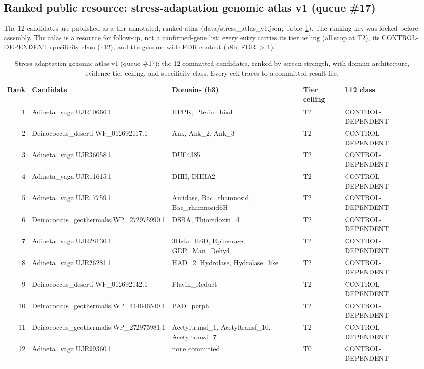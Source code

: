 \documentclass[12pt,a4paper]{article}
\begin{document}
\subsection{Ranked public resource: stress-adaptation genomic atlas v1 (queue \#17)}
The 12 candidates are published as a tier-annotated, ranked atlas (data/stress\_atlas\_v1.json; Table~\ref{tab:atlas}). The ranking key was locked before assembly. The atlas is a resource for follow-up, not a confirmed-gene list: every entry carries its tier ceiling (all stop at T2), its CONTROL-DEPENDENT specificity class (h12), and the genome-wide FDR context (h8b, FDR $>1$).
\begin{table}[h]
\centering\small
\caption{Stress-adaptation genomic atlas v1 (queue \#17): the 12 committed candidates, ranked by screen strength, with domain architecture, evidence tier ceiling, and specificity class. Every cell traces to a committed result file.}
\label{tab:atlas}
\begin{tabular}{rllll}
\hline
Rank & Candidate & Domains (h3) & Tier ceiling & h12 class \\
\hline
1 & Adineta\_vaga|UJR10666.1 & HPPK, Pterin\_bind & T2 & CONTROL-DEPENDENT \\
2 & Deinococcus\_deserti|WP\_012692117.1 & Ank, Ank\_2, Ank\_3 & T2 & CONTROL-DEPENDENT \\
3 & Adineta\_vaga|UJR36058.1 & DUF4385 & T2 & CONTROL-DEPENDENT \\
4 & Adineta\_vaga|UJR11615.1 & DHH, DHHA2 & T2 & CONTROL-DEPENDENT \\
5 & Adineta\_vaga|UJR17759.1 & Amidase, Bac\_rhamnosid, Bac\_rhamnosid6H & T2 & CONTROL-DEPENDENT \\
6 & Deinococcus\_geothermalis|WP\_272975990.1 & DSBA, Thioredoxin\_4 & T2 & CONTROL-DEPENDENT \\
7 & Adineta\_vaga|UJR28130.1 & 3Beta\_HSD, Epimerase, GDP\_Man\_Dehyd & T2 & CONTROL-DEPENDENT \\
8 & Adineta\_vaga|UJR26281.1 & HAD\_2, Hydrolase, Hydrolase\_like & T2 & CONTROL-DEPENDENT \\
9 & Deinococcus\_deserti|WP\_012692142.1 & Flavin\_Reduct & T2 & CONTROL-DEPENDENT \\
10 & Deinococcus\_geothermalis|WP\_414646549.1 & PAD\_porph & T2 & CONTROL-DEPENDENT \\
11 & Deinococcus\_geothermalis|WP\_272975981.1 & Acetyltransf\_1, Acetyltransf\_10, Acetyltransf\_7 & T2 & CONTROL-DEPENDENT \\
12 & Adineta\_vaga|UJR09360.1 & none committed & T0 & CONTROL-DEPENDENT \\
\hline
\end{tabular}
\end{table}
\end{document}
